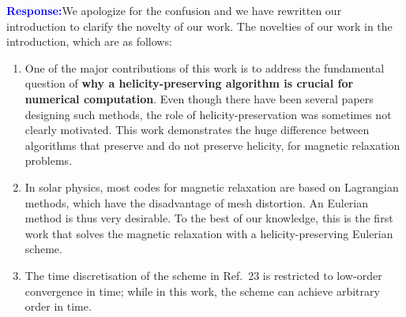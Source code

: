 \documentclass[12pt]{article}
\theoremstyle{definition}
\newcommand{\rp}{\textbf{\textcolor{blue}{Response:}}\newline}
\begin{document}
\begin{enumerate}
\rp We apologize for the confusion and we have rewritten our introduction to clarify the novelty of our work. The novelties of our work in the introduction, which are as follows:
    \begin{enumerate}
        \item %
        One of the major contributions of this work is to address the fundamental question of {\bf why a helicity-preserving algorithm is crucial for numerical computation}. Even though there have been several papers designing such methods, the role of helicity-preservation was sometimes not clearly motivated. This work demonstrates the huge difference between algorithms that preserve and do not preserve helicity, for magnetic relaxation problems.
        \item %
        In solar physics, most codes for magnetic relaxation are based on Lagrangian methods, which have the disadvantage of mesh distortion. An Eulerian method is thus very desirable. To the best of our knowledge, this is the first work that solves the magnetic relaxation with a helicity-preserving Eulerian scheme.
        \item %
        The time discretisation of the scheme   in Ref.~23 is restricted to low-order convergence in time; while in this work, the scheme can achieve arbitrary order in time. 


\end{enumerate}
\end{enumerate}
\end{document}

